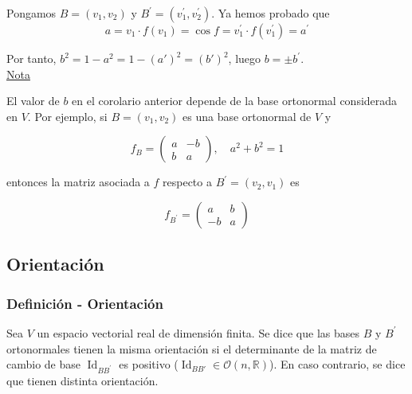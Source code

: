 \documentclass[12pt, a4paper, ones, notitlepage, openany,titlepage]{article}
\begin{document}
\noindent Pongamos $B=\left(v_{1}, v_{2}\right)$ y $B^{\prime}=\left(v_{1}^{\prime}, v_{2}^{\prime}\right)$. Ya hemos probado que
$$
a=v_{1} \cdot f\left(v_{1}\right)=\cos f=v_{1}^{\prime} \cdot f\left(v_{1}^{\prime}\right)=a^{\prime}
$$

\noindent Por tanto, $b^{2}=1-a^{2}=1-(a')^2=(b')^{2}$, luego $b= \pm b^{\prime}$.\\

\noindent\underline{Nota}

El valor de $b$ en el corolario anterior depende de la base ortonormal considerada en $V$. Por ejemplo, si $B=\left(v_{1}, v_{2}\right)$ es una base ortonormal de $V$ y

$$
f_{B}=\left(\begin{array}{rr}
	a & -b \\
	b & a
\end{array}\right), \quad a^{2}+b^{2}=1
$$

entonces la matriz asociada a $f$ respecto a $B^{\prime}=\left(v_{2}, v_{1}\right)$ es

$$
f_{B^{\prime}}=\left(\begin{array}{rr}
	a & b \\
	-b & a
\end{array}\right)
$$

\subsection{Orientación}

\subsubsection{Definición - Orientación}
Sea $V$ un espacio vectorial real de dimensión finita. Se dice que las bases $B$ y $B^{\prime}$ ortonormales tienen la misma orientación si el determinante de la matriz de cambio de base $\operatorname{Id}_{BB^{\prime}}$ es positivo ($\operatorname{Id}_{BB'} \in \mathcal{O}(n,\mathbb{R})$). En caso contrario, se dice que tienen distinta orientación.
\end{document}
